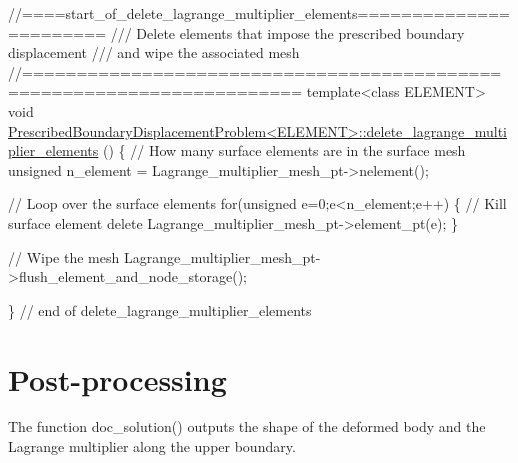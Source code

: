  
\begin{DoxyCodeInclude}
\textcolor{comment}{//====start\_of\_delete\_lagrange\_multiplier\_elements=======================}
\textcolor{comment}{/// Delete elements that impose the prescribed boundary displacement}
\textcolor{comment}{}\textcolor{comment}{/// and wipe the associated mesh}
\textcolor{comment}{}\textcolor{comment}{//=======================================================================}
\textcolor{keyword}{template}<\textcolor{keyword}{class} ELEMENT>
\textcolor{keywordtype}{void} 
      \hyperlink{classPrescribedBoundaryDisplacementProblem_a0204ae947ffd18ed3d7690395901a1e8}{PrescribedBoundaryDisplacementProblem<ELEMENT>::delete\_lagrange\_multiplier\_elements}
      ()
\{
 \textcolor{comment}{// How many surface elements are in the surface mesh}
 \textcolor{keywordtype}{unsigned} n\_element = Lagrange\_multiplier\_mesh\_pt->nelement();
 
 \textcolor{comment}{// Loop over the surface elements}
 \textcolor{keywordflow}{for}(\textcolor{keywordtype}{unsigned} e=0;e<n\_element;e++)
  \{
   \textcolor{comment}{// Kill surface element}
   \textcolor{keyword}{delete} Lagrange\_multiplier\_mesh\_pt->element\_pt(e);
  \}
 
 \textcolor{comment}{// Wipe the mesh}
 Lagrange\_multiplier\_mesh\_pt->flush\_element\_and\_node\_storage();

\} \textcolor{comment}{// end of delete\_lagrange\_multiplier\_elements}

\end{DoxyCodeInclude}




 

\hypertarget{index_doc}{}\section{Post-\/processing}\label{index_doc}
The function {\ttfamily doc\+\_\+solution()} outputs the shape of the deformed body and the Lagrange multiplier along the upper boundary.

